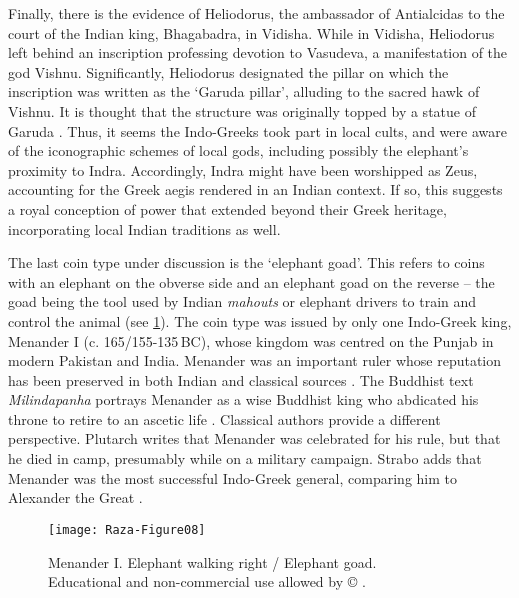 \documentclass{ijsra}
\renewcommand\BC{{\,BC\xspace}}
\def\coinindia{Educational and non-commercial use allowed by © \cite{Coin}.}
\begin{document}
Finally, there is the evidence of Heliodorus, the ambassador of Antialcidas to the court of the Indian king, Bhagabadra, in Vidisha.
While in Vidisha, Heliodorus left behind an inscription professing devotion to Vasudeva, a manifestation of the god Vishnu.
Significantly, Heliodorus designated the pillar on which the inscription was written as the ‘Garuda pillar’, alluding to the sacred hawk of Vishnu.
It is thought that the structure was originally topped by a statue of Garuda \parencite[126--127]{Mairs2014}.
Thus, it seems the Indo-Greeks took part in local cults, and were aware of the iconographic schemes of local gods, including possibly the elephant’s proximity to Indra.
Accordingly, Indra might have been worshipped as Zeus, accounting for the Greek aegis rendered in an Indian context.
If so, this suggests a royal conception of power that extended beyond their Greek heritage, incorporating local Indian traditions as well.

The last coin type under discussion is the ‘elephant goad’.
This refers to coins with an elephant on the obverse side and an elephant goad on the reverse – the goad being the tool used by Indian \emph{mahouts} or elephant drivers to train and control the animal (see \cref{fig:Raza-Figure08}).
The coin type was issued by only one Indo-Greek king, Menander I (c. 165/155-135\BC), whose kingdom was centred on the Punjab in modern Pakistan and India.
Menander was an important ruler whose reputation has been preserved in both Indian and classical sources \parencite[14--17]{Bopearachchi1993}.
The Buddhist text \emph{Milindapanha} portrays Menander as a wise Buddhist king who abdicated his throne to retire to an ascetic life \parencite[14--17]{Bopearachchi1993}.
Classical authors provide a different perspective.
Plutarch writes that Menander was celebrated for his rule, but that he died in camp, presumably while on a military campaign.
Strabo adds that Menander was the most successful Indo-Greek general, comparing him to Alexander the Great .

\begin{figure}[!htb] %
	\centering
	\texttt{[image: Raza-Figure08]}
	\caption{Menander I. Elephant walking right / Elephant goad.
		{\normalfont\scriptsize \\ \coinindia}}
	\label{fig:Raza-Figure08}
\end{figure}
\end{document}
